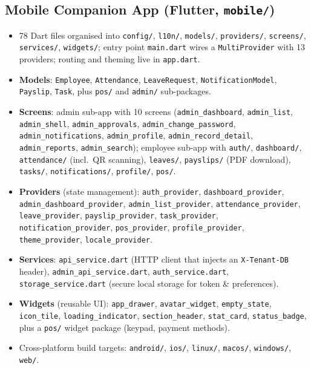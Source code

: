 \documentclass[12pt,a4paper]{report}
\begin{document}
\subsection{Mobile Companion App (Flutter, \texttt{mobile/})}
\begin{itemize}
  \item 78 Dart files organised into \texttt{config/}, \texttt{l10n/}, \texttt{models/}, \texttt{providers/}, \texttt{screens/}, \texttt{services/}, \texttt{widgets/}; entry point \texttt{main.dart} wires a \texttt{MultiProvider} with 13 providers; routing and theming live in \texttt{app.dart}.
  \item \textbf{Models}: \texttt{Employee}, \texttt{Attendance}, \texttt{LeaveRequest}, \texttt{NotificationModel}, \texttt{Payslip}, \texttt{Task}, plus \texttt{pos/} and \texttt{admin/} sub-packages.
  \item \textbf{Screens}: admin sub-app with 10 screens (\texttt{admin\_dashboard}, \texttt{admin\_list}, \texttt{admin\_shell}, \texttt{admin\_approvals}, \texttt{admin\_change\_password}, \texttt{admin\_notifications}, \texttt{admin\_profile}, \texttt{admin\_record\_detail}, \texttt{admin\_reports}, \texttt{admin\_search}); employee sub-app with \texttt{auth/}, \texttt{dashboard/}, \texttt{attendance/} (incl.\ QR scanning), \texttt{leaves/}, \texttt{payslips/} (PDF download), \texttt{tasks/}, \texttt{notifications/}, \texttt{profile/}, \texttt{pos/}.
  \item \textbf{Providers} (state management): \texttt{auth\_provider}, \texttt{dashboard\_provider}, \texttt{admin\_dashboard\_provider}, \texttt{admin\_list\_provider}, \texttt{attendance\_provider}, \texttt{leave\_provider}, \texttt{payslip\_provider}, \texttt{task\_provider}, \texttt{notification\_provider}, \texttt{pos\_provider}, \texttt{profile\_provider}, \texttt{theme\_provider}, \texttt{locale\_provider}.
  \item \textbf{Services}: \texttt{api\_service.dart} (HTTP client that injects an \texttt{X-Tenant-DB} header), \texttt{admin\_api\_service.dart}, \texttt{auth\_service.dart}, \texttt{storage\_service.dart} (secure local storage for token \& preferences).
  \item \textbf{Widgets} (reusable UI): \texttt{app\_drawer}, \texttt{avatar\_widget}, \texttt{empty\_state}, \texttt{icon\_tile}, \texttt{loading\_indicator}, \texttt{section\_header}, \texttt{stat\_card}, \texttt{status\_badge}, plus a \texttt{pos/} widget package (keypad, payment methods).
  \item Cross-platform build targets: \texttt{android/}, \texttt{ios/}, \texttt{linux/}, \texttt{macos/}, \texttt{windows/}, \texttt{web/}.
\end{itemize}
\end{document}
